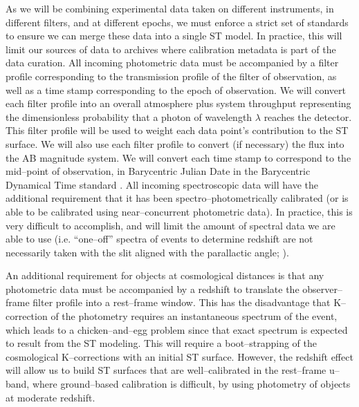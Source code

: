 As we will be combining experimental data taken on different instruments, in
different filters, and at different epochs, we must enforce a strict set of
standards to ensure we can merge these data into a single ST model. In practice,
this will limit our sources of data to archives where calibration metadata is
part of the data curation. All incoming photometric data must be accompanied by
a filter profile corresponding to the transmission profile of the filter of
observation, as well as a time stamp corresponding to the epoch of observation.
We will convert each filter profile into an overall atmosphere plus system
throughput representing the dimensionless probability that a photon of
wavelength $\lambda$ reaches the detector.  This filter profile will be used to
weight each data point's contribution to the ST surface.  We will also use each
filter profile to convert (if necessary) the flux into the AB magnitude system.
We will convert each  time stamp to correspond to the mid--point of observation,
in Barycentric Julian Date in the Barycentric Dynamical Time standard
\citep{2010PASP..122..935E}. All incoming spectroscopic data will have the
additional requirement that it has been spectro--photometrically calibrated (or
is able to be calibrated using near--concurrent photometric data).  In practice,
this is very difficult to accomplish, and will limit the amount of spectral data
we are able to use (i.e. ``one--off'' spectra of events to determine redshift
are not necessarily taken with the slit aligned with the parallactic angle;
\citealt{1982PASP...94..715F}).

An additional requirement for objects at cosmological distances is that any
photometric data must be accompanied by a redshift to translate the
observer--frame filter profile into a rest--frame window. This has the
disadvantage that K--correction of the photometry \citep{2002astro.ph.10394H}
requires an instantaneous spectrum of the event, which leads to a
chicken--and--egg problem since that exact spectrum is expected to result from
the ST modeling.  This will require a boot--strapping of the cosmological
K--corrections with an initial ST surface.  However, the redshift effect will
allow us to build ST surfaces that are well--calibrated in the rest--frame
u--band, where ground--based calibration is difficult, by using photometry of
objects at moderate redshift.

\smallskip

